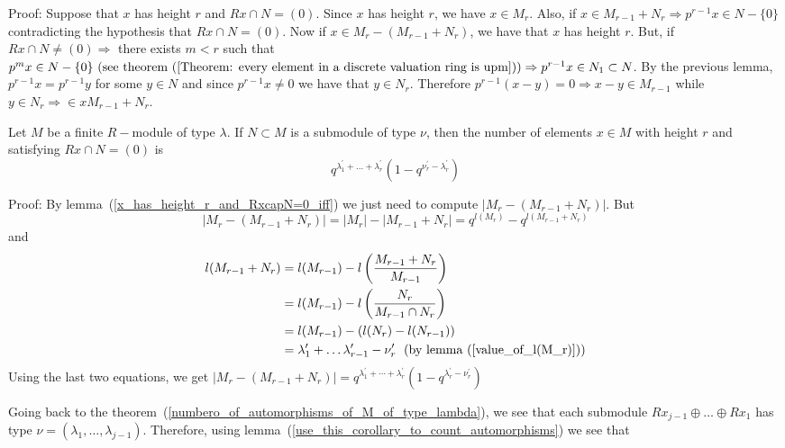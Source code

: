 Proof: Suppose that $x$ has height $r$ and $Rx\cap N=(0)$. Since $x$ has height $r$, we have $x\in M_r$. Also, if $x\in M_{r-1}+N_r\Rightarrow p^{r-1}x\in N-\{0\}$ contradicting the hypothesis that $Rx\cap N=(0)$. Now if $x\in M_r-(M_{r-1}+N_r)$, we have that $x$ has height $r$. But, if $Rx\cap N\neq(0)\Rightarrow$ there exists $m<r$ such that $p^mx\in N-\{0\}\text{ (see theorem~(\ref{Theorem: every element in a discrete valuation ring is upm})})\Rightarrow p^{r-1}x\in N_1\subset N$. By the previous lemma, $p^{r-1}x=p^{r-1}y$ for some $y\in N$ and since $p^{r-1}x\neq0$ we have that $y\in N_r$. Therefore $p^{r-1}(x-y)=0\Rightarrow x-y\in M_{r-1}$ while $y\in N_r\Rightarrow\in x M_{r-1}+N_r$.
\begin{dang}
    \begin{lemma}\label{use_this_corollary_to_count_automorphisms}\cite{macdonald1998symmetric}
       Let $M$ be a finite $R-$module of type $\lambda$. If $N\subset M$ is a submodule of type $\nu$, then the number of elements $x\in M$ with height $r$ and satisfying $Rx\cap N=(0)$ is
        \begin{equation}
            q^{\lambda_1^\prime+\dots+\lambda_r^\prime}(1-q^{\nu_r^\prime-\lambda_r^\prime})
        \end{equation}
    \end{lemma}
\end{dang}
Proof: By lemma~(\ref{x_has_height_r_and_RxcapN=0_iff}) we just need to compute $|M_r-(M_{r-1}+N_r)|$. But
\begin{equation}
        |M_r-(M_{r-1}+N_r)|  = |M_r|-|M_{r-1}+N_r| = q^{l(M_r)}-q^{l(M_{r-1}+N_r)}
\end{equation}
and 
\begin{equation}
    \begin{split}
        l(M_{r-1}+N_r) &=l(M_{r-1})-l\left(\frac{M_{r-1}+N_r}{M_{r-1}}\right)\\
        &=l(M_{r-1})-l\left(\frac{N_r}{M_{r-1}\cap N_r}\right)\\
        &=l(M_{r-1})-(l(N_r)-l(N_{r-1}))\\
        &=\lambda_1^\prime+\dots\lambda_{r-1}^\prime - \nu_r^\prime\;\text{ (by lemma~(\ref{value_of_l(M_r)})})
    \end{split}
\end{equation}
Using the last two equations, we get $  |M_r-(M_{r-1}+N_r)|=q^{\lambda_1^\prime+\cdots+\lambda_{r}^\prime}(1-q^{\lambda_r^\prime-\nu_r^\prime})$
\par
Going back to the theorem~(\ref{numbero_of_automorphisms_of_M_of_type_lambda}), we see that each submodule $Rx_{j-1}\oplus\dots\oplus Rx_1$ has type $\nu=(\lambda_1,\dots,\lambda_{j-1})$. Therefore, using lemma~(\ref{use_this_corollary_to_count_automorphisms}) we see that
